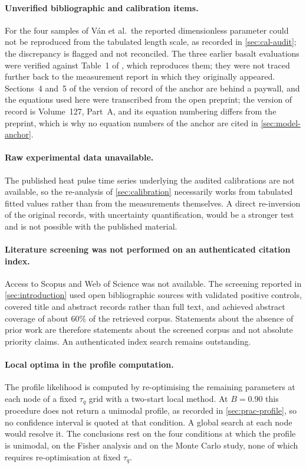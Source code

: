 \documentclass[preprint,12pt,a4paper]{elsarticle}
\theoremstyle{plain}
\theoremstyle{definition}
\theoremstyle{remark}
\newcommand{\tq}{\tau_{q}}
\newcommand{\Bnum}{B}
\begin{document}
\paragraph{Unverified bibliographic and calibration items.}
For the four samples of V\'an et al.\ the reported dimensionless parameter
could not be reproduced from the tabulated length scale, as recorded in
\cref{sec:cal-audit}; the discrepancy is flagged and not reconciled. The three
earlier basalt evaluations were verified against Table~1 of
\cite{FeherKovacs2021}, which reproduces them; they were not traced further
back to the measurement report in which they originally appeared.
Sections~4 and~5 of the version of record of the anchor are behind a paywall,
and the equations used here were transcribed from the open preprint; the
version of record is Volume~127, Part~A, and its equation numbering differs
from the preprint, which is why no equation numbers of the anchor are cited in
\cref{sec:model-anchor}.

\paragraph{Raw experimental data unavailable.}
The published heat pulse time series underlying the audited calibrations are
not available, so the re-analysis of \cref{sec:calibration} necessarily works
from tabulated fitted values rather than from the measurements themselves. A
direct re-inversion of the original records, with uncertainty quantification,
would be a stronger test and is not possible with the published material.

\paragraph{Literature screening was not performed on an authenticated citation index.}
Access to Scopus and Web of Science was not available. The screening reported
in \cref{sec:introduction} used open bibliographic sources with validated positive
controls, covered title and abstract records rather than full text, and
achieved abstract coverage of about $60\%$ of the retrieved corpus. Statements
about the absence of prior work are therefore statements about the screened
corpus and not absolute priority claims. An authenticated index search remains
outstanding.

\paragraph{Local optima in the profile computation.}
The profile likelihood is computed by re-optimising the remaining parameters at
each node of a fixed $\tq$ grid with a two-start local method. At
$\Bnum = 0.90$ this procedure does not return a unimodal profile, as recorded in
\cref{sec:prac-profile}, so no confidence interval is quoted at that condition.
A global search at each node would resolve it. The conclusions rest on the four
conditions at which the profile is unimodal, on the Fisher analysis and on the
Monte Carlo study, none of which requires re-optimisation at fixed $\tq$.
\end{document}
